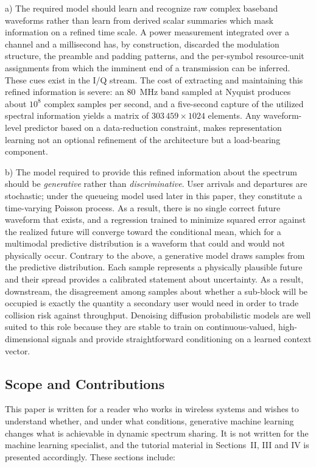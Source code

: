 \documentclass[lettersize,journal]{IEEEtran}
\begin{document}
a) The required model should learn and recognize raw complex baseband
waveforms rather than learn from derived scalar summaries 
which mask information on a refined time scale.
A power measurement integrated over a channel and a millisecond has, by
construction, discarded the modulation structure, the preamble and padding
patterns, and the per-symbol resource-unit assignments from which the
imminent end of a transmission can be inferred.
These cues exist in the I/Q stream.
The cost of extracting and maintaining this refined information 
is severe: an 80~MHz band sampled at
Nyquist produces about $10^8$ complex samples per second, and
a five-second capture of the utilized spectral information yields a matrix of
$303\,459 \times 1024$ elements.
Any waveform-level predictor based on a data-reduction constraint,
makes representation learning not an optional refinement of the architecture
but a load-bearing component.

b) The model required to provide this refined information about the spectrum 
should be \emph{generative} rather than \emph{discriminative}.
User arrivals and departures are stochastic;
under the queueing model used later in this paper, they constitute a
time-varying Poisson process.
As a result, there is no single correct future
waveform that exists, and a regression trained to minimize squared error against the
realized future will converge toward the conditional mean, which for a
multimodal predictive distribution is a waveform that could and would not
physically occur.
Contrary to the above, a generative model draws samples from the
predictive distribution.
Each sample represents a physically plausible future and
their spread provides a calibrated statement about uncertainty. As a result,
downstream, the disagreement among samples about whether a sub-block
will be occupied is exactly the quantity a secondary user would need in
order to trade collision risk against throughput.
Denoising diffusion probabilistic models \cite{Ho2020, SohlDickstein2015, Song2021}
are well suited to this role because they are stable to train on
continuous-valued, high-dimensional signals and provide straightforward
conditioning on a learned context vector.
\subsection{\textbf{Scope and Contributions}}
This paper is written for a reader who works in wireless systems and
wishes to understand whether, and under what conditions, generative
machine learning changes what is achievable in dynamic spectrum sharing.
It is not written for the machine learning specialist, and the tutorial
material in Sections~II, III and IV is presented accordingly. 
These sections include:
\end{document}
